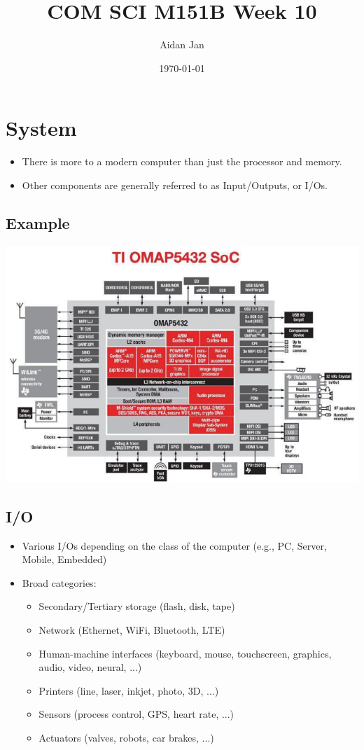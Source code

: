 \documentclass[10pt]{article}
\title{COM SCI M151B Week 10}
\author{Aidan Jan}
\date{\today}
\begin{document}
\maketitle
\section*{System}
\begin{itemize}
    \item There is more to a modern computer than just the processor and memory.
    \item Other components are generally referred to as Input/Outputs, or I/Os.
\end{itemize}
\subsection*{Example}
\begin{center}
    \includegraphics[scale=0.6]{W10_1.png}
\end{center}
\subsection*{I/O}
\begin{itemize}
    \item Various I/Os depending on the class of the computer (e.g., PC, Server, Mobile, Embedded)
    \item Broad categories:
    \begin{itemize}
        \item Secondary/Tertiary storage (flash, disk, tape)
        \item Network (Ethernet, WiFi, Bluetooth, LTE)
        \item Human-machine interfaces (keyboard, mouse, touchscreen, graphics, audio, video, neural, ...)
        \item Printers (line, laser, inkjet, photo, 3D, ...)
        \item Sensors (process control, GPS, heart rate, ...)
        \item Actuators (valves, robots, car brakes, ...)
    \end{itemize}
\end{itemize}
\end{document}
